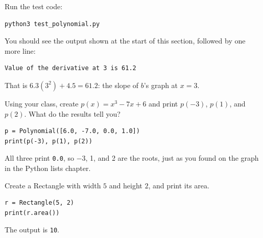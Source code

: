 Run the test code:
\begin{verbatim}
python3 test_polynomial.py
\end{verbatim}

You should see the output shown at the start of this section, followed by
one more line:
\begin{verbatim}
Value of the derivative at 3 is 61.2
\end{verbatim}
That is $6.3(3^2) + 4.5 = 61.2$: the slope of $b$'s graph at $x = 3$.

\begin{Exercise}[title={Evaluate it}, label=cls_eval]
Using your  class, create $p(x) = x^3 - 7x + 6$ and
print $p(-3)$, $p(1)$, and $p(2)$. What do the results tell you?
\end{Exercise}
\begin{Answer}[ref=cls_eval]
\begin{verbatim}
p = Polynomial([6.0, -7.0, 0.0, 1.0])
print(p(-3), p(1), p(2))
\end{verbatim}
All three print \texttt{0.0}, so $-3$, 1, and 2 are the roots, just as you
found on the graph in the Python lists chapter.
\end{Answer}

\begin{Exercise}[title={Second Rectangle}, label=cls1]
Create a Rectangle with width $5$ and height $2$, and print its area.
\end{Exercise}
\begin{Answer}[ref=cls1]
\begin{verbatim}
r = Rectangle(5, 2)
print(r.area())
\end{verbatim}
The output is \texttt{10}.
\end{Answer}

